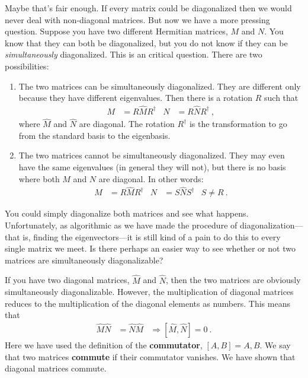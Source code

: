 \documentclass[12pt, oneside]{report}    %
\begin{document}
Maybe that's fair enough. If every matrix could be diagonalized then we would never deal with non-diagonal matrices. But now we have a more pressing question. Suppose you have two different Hermitian matrices, $M$ and $N$. You know that they can both be diagonalized, but you do not know if they can be \emph{simultaneously} diagonalized. This is an critical question. There are two possibilities:
\begin{enumerate}
    \item The two matrices can be simultaneously diagonalized. They are different only because they have different eigenvalues. Then there is a rotation $R$ such that 
    \begin{align}
        M &= R \hat M R^\dag
        &
        N &= R \hat N R^\dag \ ,
    \end{align}
    where $\hat M$ and $\hat N$ are diagonal. The rotation $R^\dag$ is the transformation to go from the standard basis to the eigenbasis.
    \item The two matrices cannot be simultaneously diagonalized. They may even have the same eigenvalues (in general they will not), but there is no basis where both $M$ and $N$ are diagonal. In other words:
     \begin{align}
        M &= R \hat M R^\dag
        &
        N &= S \hat N S^\dag 
        &
        S\neq R \ .
    \end{align}
\end{enumerate}
You could simply diagonalize both matrices and see what happens. Unfortunately, as algorithmic as we have made the procedure of diagonalization---that is, finding the eigenvectors---it is still kind of a pain to do this to every single matrix we meet. Is there perhaps an easier way to see whether or not two matrices are simultaneously diagonalizable?

\begin{example}
If you have two diagonal matrices, $\hat M$ and $\hat N$, then the two matrices are obviously simultaneously diagonalizable. However, the multiplication of diagonal matrices reduces to the multiplication of the diagonal elements as numbers. This means that
\begin{align}
    \hat M \hat N &= \hat N \hat M
    &\Rightarrow 
    \left[\hat M, \hat N\right] = 0
    \ .
\end{align}
Here we have used the definition of the \textbf{commutator}, $[A,B] = A,B$. We say that two matrices \textbf{commute} if their commutator vanishes. We have shown that diagonal matrices commute.
\end{example}
\end{document}
